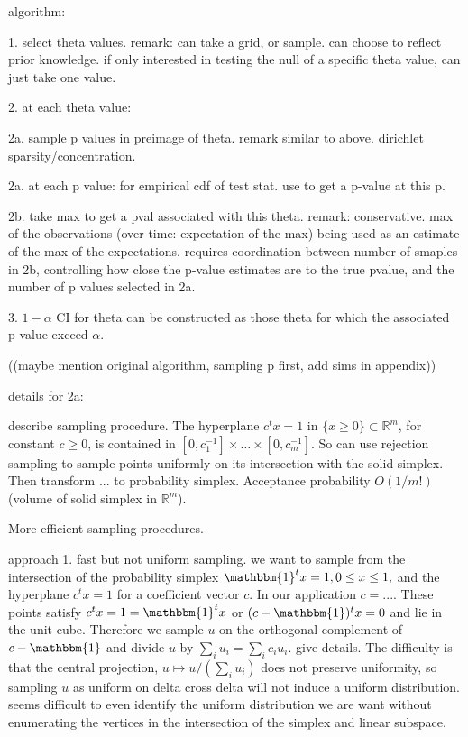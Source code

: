 \documentclass{article}
\renewcommand{\c}c
\begin{document}
algorithm:

1. select theta values. remark: can take a grid, or sample. can choose to reflect prior knowledge. if only interested in testing the null of a specific theta value, can just take one value.

2. at each theta value:

2a. sample p values in preimage of theta. remark
similar to above. dirichlet sparsity/concentration.

2a. at each p value: for empirical cdf of test stat. use to get a
p-value at this p.

2b. take max to get a pval associated with this theta. remark:
conservative. max of the observations (over time: expectation of the
max) being used as an estimate of the max of the expectations. requires coordination between number of smaples in 2b, controlling how close the p-value estimates are to the true pvalue, and the number of p values selected in 2a.

3. $1-\alpha$ CI for theta can be constructed as those theta for which the associated p-value exceed $\alpha$.


((maybe mention original algorithm, sampling p first, add sims in appendix))


details for 2a:

describe sampling procedure. The hyperplane $c^tx=1$ in $\{x\ge 0\}\subset\mathbb{R}^m$, for constant $c\ge 0$, is contained in $[0,c_1^{-1}]\times\ldots\times[0,c_m^{-1}]$. So can use rejection sampling to sample points uniformly on its intersection with the solid simplex. Then transform ... to probability simplex. Acceptance probability $O(1/m!)$ (volume of solid simplex in $\mathbb{R}^m$).

More efficient sampling procedures.

approach 1. fast but not uniform sampling. we want to sample from the
intersection of the probability simplex
$\mathbbm{1}^tx=1, 0\le x\le 1,$ and the hyperplane $\c^t x=1$ for a
coefficient vector $\c$. In our application $\c= ...$. These points
satisfy $c^t x=1=\mathbbm{1}^t x$ or $(c - \mathbbm{1})^t x = 0$ and
lie in the unit cube. Therefore we sample $u$ on the orthogonal
complement of $c - \mathbbm{1}$ and divide $u$ by
$\sum_i u_i = \sum_i c_iu_i$. give details. The difficulty is that the
central projection, $u\mapsto u/(\sum_i u_i)$ does not preserve
uniformity, so sampling $u$ as uniform on delta cross delta will not
induce a uniform distribution. seems difficult to even identify the
uniform distribution we are want without enumerating the vertices in
the intersection of the simplex and linear subspace.
\end{document}
